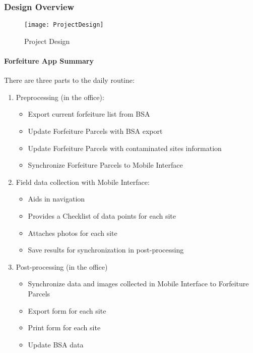 \subsubsection{Design Overview}
\vspace{-.2in}

\begin{figure}[h!]
\centering
    \texttt{[image: ProjectDesign]}
\vspace{-.2in}

\caption{Project Design}
\end{figure}
\clearpage
\paragraph{Forfeiture App Summary}
\vspace{.25in}

There are {\LARGE three parts} to the daily routine:
\vspace{.25in}

\begin{enumerate}
\item \Large Preprocessing \normalsize(in the office):
\begin{itemize}
\item Export current forfeiture list from BSA
\item Update Forfeiture Parcels with BSA export
\item Update Forfeiture Parcels with contaminated sites information
\item Synchronize Forfeiture Parcels to Mobile Interface
\end{itemize}
\item \Large Field data collection \normalsize with Mobile Interface:
\begin{itemize}
\item Aids in navigation
\item Provides a Checklist of data points for each site
\item Attaches photos for each site
\item Save results for synchronization in post-processing
\end{itemize}
\item \Large Post-processing \normalsize (in the office)
\begin{itemize}
\item Synchronize data and images collected in Mobile Interface to Forfeiture Parcels
\item Export form for each site
\item Print form for each site
\item Update BSA data
\end{itemize}
\end{enumerate}
\clearpage
